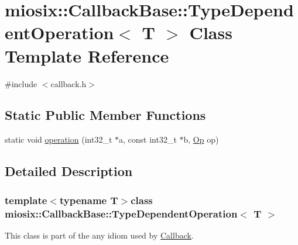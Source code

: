 \hypertarget{classmiosix_1_1_callback_base_1_1_type_dependent_operation}{\section{miosix\-:\-:Callback\-Base\-:\-:Type\-Dependent\-Operation$<$ T $>$ Class Template Reference}
\label{classmiosix_1_1_callback_base_1_1_type_dependent_operation}
}


{\ttfamily \#include $<$callback.\-h$>$}

\subsection*{Static Public Member Functions}
\begin{DoxyCompactItemize}
\item 
static void \hyperlink{classmiosix_1_1_callback_base_1_1_type_dependent_operation_a5ba074f1fc67345b5771312cbea7af63}{operation} (int32\-\_\-t $\ast$a, const int32\-\_\-t $\ast$b, \hyperlink{classmiosix_1_1_callback_base_a8f24acb613ae030f034ff390a265141b}{Op} op)
\end{DoxyCompactItemize}


\subsection{Detailed Description}
\subsubsection*{template$<$typename T$>$class miosix\-::\-Callback\-Base\-::\-Type\-Dependent\-Operation$<$ T $>$}

This class is part of the any idiom used by \hyperlink{classmiosix_1_1_callback}{Callback}. 

